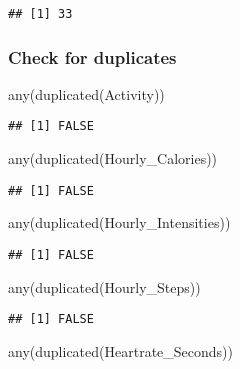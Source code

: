 \documentclass[
]{article}
\newenvironment{Shaded}{\begin{snugshade}}{\end{snugshade}}
\newcommand{\FunctionTok}[1]{\textcolor[rgb]{0.00,0.00,0.00}{#1}}
\newcommand{\NormalTok}[1]{#1}
\begin{document}
\begin{verbatim}
## [1] 33
\end{verbatim}

\hypertarget{check-for-duplicates}{%
\subsubsection{Check for duplicates}\label{check-for-duplicates}}

\begin{Shaded}
\begin{Highlighting}[]
\FunctionTok{any}\NormalTok{(}\FunctionTok{duplicated}\NormalTok{(Activity))}
\end{Highlighting}
\end{Shaded}

\begin{verbatim}
## [1] FALSE
\end{verbatim}

\begin{Shaded}
\begin{Highlighting}[]
\FunctionTok{any}\NormalTok{(}\FunctionTok{duplicated}\NormalTok{(Hourly\_Calories))}
\end{Highlighting}
\end{Shaded}

\begin{verbatim}
## [1] FALSE
\end{verbatim}

\begin{Shaded}
\begin{Highlighting}[]
\FunctionTok{any}\NormalTok{(}\FunctionTok{duplicated}\NormalTok{(Hourly\_Intensities))}
\end{Highlighting}
\end{Shaded}

\begin{verbatim}
## [1] FALSE
\end{verbatim}

\begin{Shaded}
\begin{Highlighting}[]
\FunctionTok{any}\NormalTok{(}\FunctionTok{duplicated}\NormalTok{(Hourly\_Steps))}
\end{Highlighting}
\end{Shaded}

\begin{verbatim}
## [1] FALSE
\end{verbatim}

\begin{Shaded}
\begin{Highlighting}[]
\FunctionTok{any}\NormalTok{(}\FunctionTok{duplicated}\NormalTok{(Heartrate\_Seconds))}
\end{Highlighting}
\end{Shaded}
\end{document}
